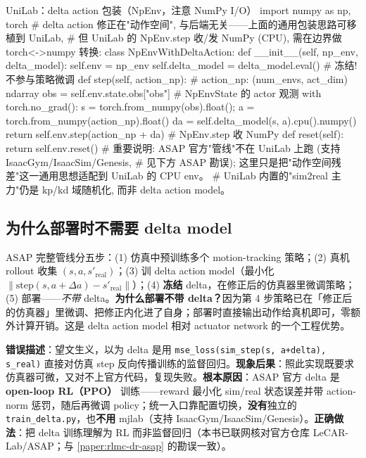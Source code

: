 \begin{codebox}[Python]{UniLab：delta action 包装（NpEnv，注意 NumPy I/O）}
import numpy as np, torch
# delta action 修正在"动作空间", 与后端无关——上面的通用包装思路可移植到 UniLab,
# 但 UniLab 的 NpEnv.step 收/发 NumPy (CPU), 需在边界做 torch<->numpy 转换:
class NpEnvWithDeltaAction:
    def __init__(self, np_env, delta_model):
        self.env = np_env
        self.delta_model = delta_model.eval()      # 冻结! 不参与策略微调
    def step(self, action_np):                     # action_np: (num_envs, act_dim) ndarray
        obs = self.env.state.obs["obs"]            # NpEnvState 的 actor 观测
        with torch.no_grad():
            s = torch.from_numpy(obs).float(); a = torch.from_numpy(action_np).float()
            da = self.delta_model(s, a).cpu().numpy()
        return self.env.step(action_np + da)       # NpEnv.step 收 NumPy
    def reset(self): return self.env.reset()
# 重要说明: ASAP 官方"管线"不在 UniLab 上跑 (支持 IsaacGym/IsaacSim/Genesis,
# 见下方 ASAP 勘误); 这里只是把"动作空间残差"这一通用思想适配到 UniLab 的 CPU env。
# UniLab 内置的"sim2real 主力"仍是 kp/kd 域随机化, 而非 delta action model。
\end{codebox}

\subsection{为什么部署时不需要 delta model}
\label{sec:rlmc-act-delta-deploy}

ASAP 完整管线分五步：(1) 仿真中预训练多个 motion-tracking 策略；(2) 真机 rollout 收集 $(s,a,s'_{\text{real}})$；(3) 训 delta action model（最小化 $\|\text{step}(s,a+\Delta a)-s'_{\text{real}}\|$）；(4) \textbf{冻结} delta，在修正后的仿真器里微调策略；(5) 部署——\emph{不带} delta。\textbf{为什么部署不带 delta？}因为第 4 步策略已在「修正后的仿真器」里微调、把修正内化进了自身；部署时直接输出动作给真机即可，零额外计算开销。这是 delta action model 相对 actuator network 的一个工程优势。

\begin{pitfall}
\textbf{错误描述}：望文生义，以为 delta 是用 \verb|mse_loss(sim_step(s, a+delta), s_real)| 直接对仿真 step 反向传播训练的监督回归。\textbf{现象后果}：照此实现既要求仿真器可微，又对不上官方代码，复现失败。\textbf{根本原因}：ASAP 官方 delta 是 \textbf{open-loop RL（PPO）} 训练——reward 最小化 sim/real 状态误差并带 action-norm 惩罚，随后再微调 policy；统一入口靠配置切换，\textbf{没有}独立的 \verb|train_delta.py|，也\textbf{不用} mjlab（支持 IsaacGym/IsaacSim/Genesis）。\textbf{正确做法}：把 delta 训练理解为 RL 而非监督回归（本书已联网核对官方仓库 LeCAR-Lab/ASAP；与 \cref{paper:rlmc-dr-asap} 的勘误一致）。
\end{pitfall}

